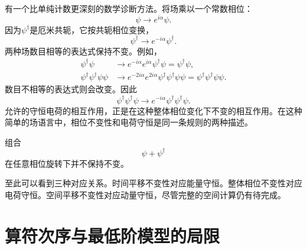 有一个比单纯计数更深刻的数学诊断方法。将场乘以一个常数相位：
\begin{equation}
\psi\longrightarrow e^{i\alpha}\psi.
\end{equation}
因为\(\psi^\dagger\)是厄米共轭，它按共轭相位变换，
\begin{equation}
\psi^\dagger\longrightarrow e^{-i\alpha}\psi^\dagger.
\end{equation}
两种场数目相等的表达式保持不变。例如，
\begin{align}
\psi^\dagger\psi
&\longrightarrow
e^{-i\alpha}e^{i\alpha}\psi^\dagger\psi
=\psi^\dagger\psi,\\
\psi^\dagger\psi^\dagger\psi\psi
&\longrightarrow
e^{-2i\alpha}e^{2i\alpha}
\psi^\dagger\psi^\dagger\psi\psi
=\psi^\dagger\psi^\dagger\psi\psi.
\end{align}
数目不相等的表达式则会改变。因此
\begin{equation}
\psi^\dagger\psi^\dagger\psi
\longrightarrow
e^{-i\alpha}\psi^\dagger\psi^\dagger\psi.
\end{equation}
允许的守恒电荷的相互作用，正是在这种整体相位变化下不变的相互作用。在这种简单的场语言中，相位不变性和电荷守恒是同一条规则的两种描述。

组合
\begin{equation}
\psi+\psi^\dagger
\end{equation}
在任意相位旋转下并不保持不变。

\begin{classroomqa}
\end{classroomqa}

\begin{classroomqa}
\end{classroomqa}

至此可以看到三种对应关系。时间平移不变性对应能量守恒。整体相位不变性对应电荷守恒。空间平移不变性对应动量守恒，尽管完整的空间计算仍有待完成。

\section{算符次序与最低阶模型的局限}


